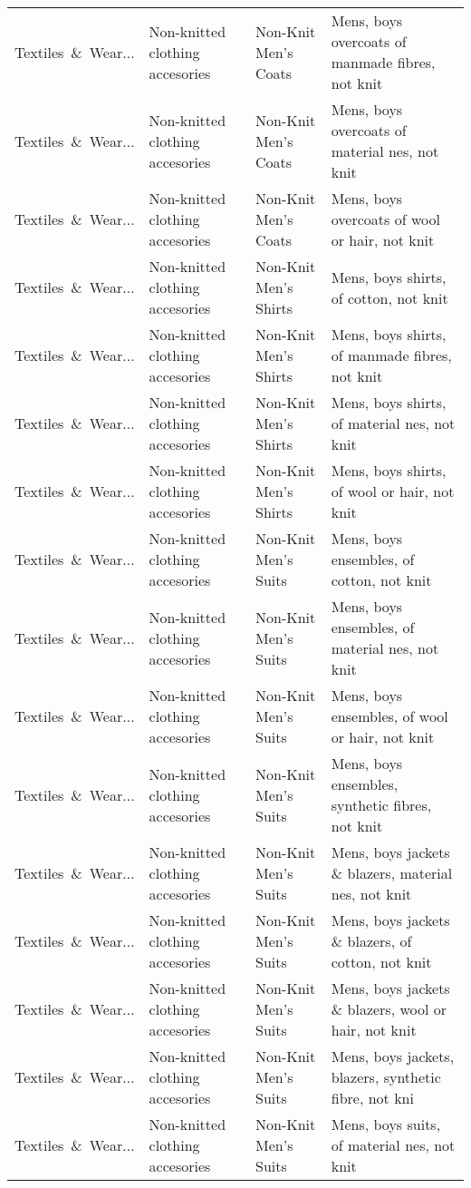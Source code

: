 \begin{appendices}
\begin{xltabular}{\textwidth}{|p{0.10\textwidth}|p{0.25\textwidth}|p{0.24\textwidth}|p{0.31\textwidth}|}
Textiles\ \&\ Wear... & Non-knitted clothing accesories & Non-Knit Men's Coats & Mens, boys overcoats of manmade fibres, not knit \\
Textiles\ \&\ Wear... & Non-knitted clothing accesories & Non-Knit Men's Coats & Mens, boys overcoats of material nes, not knit \\
Textiles\ \&\ Wear... & Non-knitted clothing accesories & Non-Knit Men's Coats & Mens, boys overcoats of wool or hair, not knit \\
Textiles\ \&\ Wear... & Non-knitted clothing accesories & Non-Knit Men's Shirts & Mens, boys shirts, of cotton, not knit \\
Textiles\ \&\ Wear... & Non-knitted clothing accesories & Non-Knit Men's Shirts & Mens, boys shirts, of manmade fibres, not knit \\
Textiles\ \&\ Wear... & Non-knitted clothing accesories & Non-Knit Men's Shirts & Mens, boys shirts, of material nes, not knit \\
Textiles\ \&\ Wear... & Non-knitted clothing accesories & Non-Knit Men's Shirts & Mens, boys shirts, of wool or hair, not knit \\
Textiles\ \&\ Wear... & Non-knitted clothing accesories & Non-Knit Men's Suits & Mens, boys ensembles, of cotton, not knit \\
Textiles\ \&\ Wear... & Non-knitted clothing accesories & Non-Knit Men's Suits & Mens, boys ensembles, of material nes, not knit \\
Textiles\ \&\ Wear... & Non-knitted clothing accesories & Non-Knit Men's Suits & Mens, boys ensembles, of wool or hair, not knit \\
Textiles\ \&\ Wear... & Non-knitted clothing accesories & Non-Knit Men's Suits & Mens, boys ensembles, synthetic fibres, not knit \\
Textiles\ \&\ Wear... & Non-knitted clothing accesories & Non-Knit Men's Suits & Mens, boys jackets \& blazers, material nes, not knit \\
Textiles\ \&\ Wear... & Non-knitted clothing accesories & Non-Knit Men's Suits & Mens, boys jackets \& blazers, of cotton, not knit \\
Textiles\ \&\ Wear... & Non-knitted clothing accesories & Non-Knit Men's Suits & Mens, boys jackets \& blazers, wool or hair, not knit \\
Textiles\ \&\ Wear... & Non-knitted clothing accesories & Non-Knit Men's Suits & Mens, boys jackets, blazers, synthetic fibre, not kni \\
Textiles\ \&\ Wear... & Non-knitted clothing accesories & Non-Knit Men's Suits & Mens, boys suits, of material nes, not knit \\

\end{xltabular}
\end{appendices}
